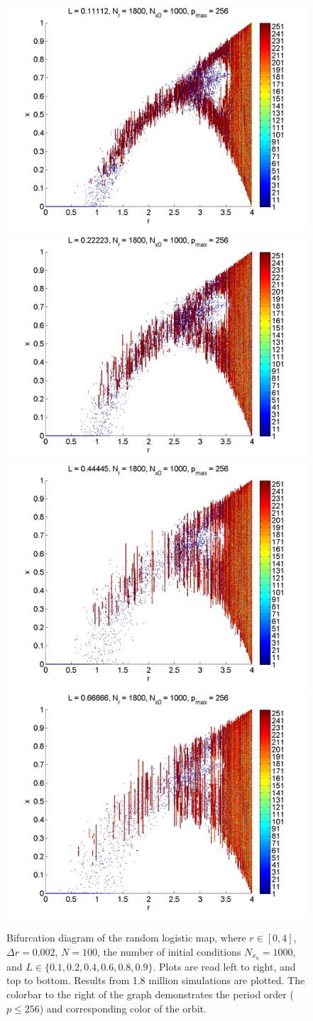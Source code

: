 \begin{figure}[H]\linespread{1}
\caption[Bifurcation diagram of the random logistic map, high resolution]{Bifurcation diagram of the random
logistic map, where $r \in [0,4]$, $\Delta r = 0.002$, $N=100$, the
number of initial conditions $N_{x_0}=1000$, and $L\in
\{0.1,0.2,0.4,0.6,0.8,0.9\}$. Plots are read left to right, and top to
bottom. Results from 1.8 million simulations are plotted. The colorbar to the right
of the graph demonstrates the period order ($p\leq 256$) and corresponding color of
the orbit.}\label{fig:rlogbif}
	\begin{center}
		\includegraphics[width=.5\textwidth]{figs/rlog_bif_L_01.png}\hfill
		\includegraphics[width=.5\textwidth]{figs/rlog_bif_L_02.png}\\
		\includegraphics[width=.5\textwidth]{figs/rlog_bif_L_04.png}\hfill
		\includegraphics[width=.5\textwidth]{figs/rlog_bif_L_06.png}\\

\end{center}
\end{figure}
